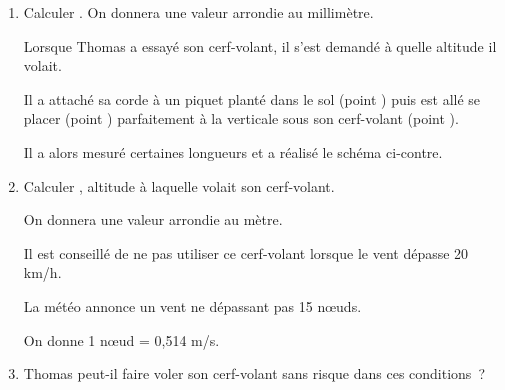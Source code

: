 \documentclass[exercice,a4]{thedocument}%
\begin{document}
    \begin{enumerate}
        \item Calculer . On donnera une valeur arrondie au
        millimètre.\par\noindent
        \begingroup\leavevmode\hspace*{-\leftmargin}%
        \begin{minipage}[c]{.6\linewidth}
            Lorsque Thomas a essayé son cerf-volant, il s'est demandé à quelle
            altitude il volait.\par\noindent Il a attaché sa corde à un piquet
            planté dans le sol (point ) puis est allé se placer
            (point ) parfaitement à la verticale sous son
            cerf-volant (point ).\par\noindent Il a alors mesuré
            certaines longueurs et a réalisé le schéma ci-contre.
        \end{minipage}\endgroup\hskip20pt
        \item Calculer , altitude à laquelle volait son cerf-volant.
        \par\noindent On donnera une valeur arrondie au mètre.\par\bigskip
        \begingroup\leavevmode\hspace*{-\leftmargin}%
        \begin{minipage}{.6\linewidth}
            Il est conseillé de ne pas utiliser ce cerf-volant lorsque  le vent dépasse
            20 km/h.\par
            La météo annonce un vent ne dépassant pas 15 n\oe uds.\par\noindent
            On donne 1 n\oe ud = 0,514 m/s.
        \end{minipage}\endgroup
        \item Thomas peut-il faire voler son cerf-volant sans risque dans ces
        conditions~?
    \end{enumerate}
    \showthesource
\end{document}
